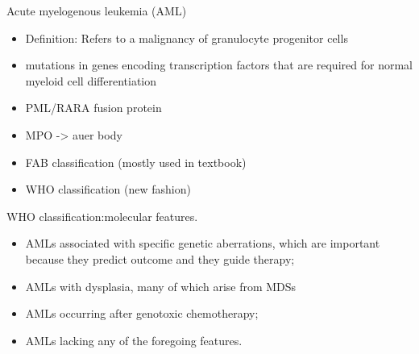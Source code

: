 \documentclass[
  ignorenonframetext,
]{beamer}
\begin{document}
\begin{frame}
\begin{block}{Acute myelogenous leukemia (AML)}
\protect\hypertarget{acute-myelogenous-leukemia-aml}{}
\begin{itemize}
\item
  Definition: Refers to a malignancy of granulocyte progenitor cells
\item
  mutations in genes encoding transcription factors that are required
  for normal myeloid cell differentiation
\item
  PML/RARA fusion protein
\item
  MPO -\textgreater{} auer body
\end{itemize}
\end{block}
\end{frame}

\begin{frame}
\begin{itemize}
\item
  FAB classification (mostly used in textbook)
\item
  WHO classification (new fashion)
\end{itemize}
\end{frame}

\begin{frame}
\begin{block}{WHO classification:molecular features.}
\protect\hypertarget{who-classificationmolecular-features.}{}
\begin{itemize}
\item
  AMLs associated with specific genetic aberrations, which are important
  because they predict outcome and they guide therapy;
\item
  AMLs with dysplasia, many of which arise from MDSs
\item
  AMLs occurring after genotoxic chemotherapy;
\item
  AMLs lacking any of the foregoing features.
\end{itemize}
\end{block}
\end{frame}
\end{document}
